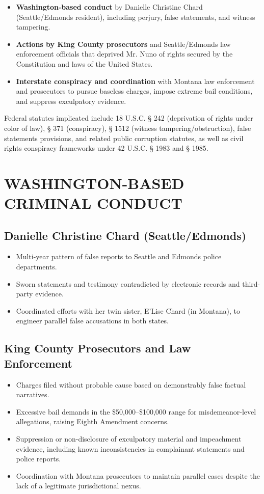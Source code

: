 \documentclass[12pt,oneside]{article}
\begin{document}
\begin{flushleft}
\begin{itemize}
\item \textbf{Washington-based conduct} by Danielle Christine Chard (Seattle/Edmonds resident), including perjury, false statements, and witness tampering.
\item \textbf{Actions by King County prosecutors} and Seattle/Edmonds law enforcement officials that deprived Mr. Nuno of rights secured by the Constitution and laws of the United States.
\item \textbf{Interstate conspiracy and coordination} with Montana law enforcement and prosecutors to pursue baseless charges, impose extreme bail conditions, and suppress exculpatory evidence.
\end{itemize}

Federal statutes implicated include 18 U.S.C. § 242 (deprivation of rights under color of law), § 371 (conspiracy), § 1512 (witness tampering/obstruction), false statements provisions, and related public corruption statutes, as well as civil rights conspiracy frameworks under 42 U.S.C. § 1983 and § 1985.

\section*{WASHINGTON-BASED CRIMINAL CONDUCT}

\subsection*{Danielle Christine Chard (Seattle/Edmonds)}

\begin{itemize}
\item Multi-year pattern of false reports to Seattle and Edmonds police departments.
\item Sworn statements and testimony contradicted by electronic records and third-party evidence.
\item Coordinated efforts with her twin sister, E'Lise Chard (in Montana), to engineer parallel false accusations in both states.
\end{itemize}

\subsection*{King County Prosecutors and Law Enforcement}

\begin{itemize}
\item Charges filed without probable cause based on demonstrably false factual narratives.
\item Excessive bail demands in the \$50,000--\$100,000 range for misdemeanor-level allegations, raising Eighth Amendment concerns.
\item Suppression or non-disclosure of exculpatory material and impeachment evidence, including known inconsistencies in complainant statements and police reports.
\item Coordination with Montana prosecutors to maintain parallel cases despite the lack of a legitimate jurisdictional nexus.
\end{itemize}


\end{flushleft}
\end{document}
